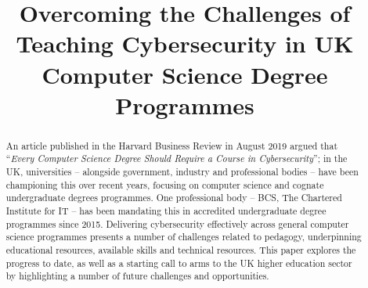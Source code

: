 \documentclass[sigconf]{acmart}
\begin{document}
\title{Overcoming the Challenges of Teaching Cybersecurity in UK Computer Science
Degree Programmes}



\begin{comment}

\author{Tom Crick}
\affiliation{%
  \institution{Swansea University}
  \city{Swansea}
  \country{UK}
}
\email{thomas.crick@swansea.ac.uk}


\author{James H. Davenport}
\affiliation{%
  \institution{ University of Bath}
  \city{Bath}
  \country{UK}
}
\email{j.h.davenport@bath.ac.uk}

\author{Alastair Irons}
\affiliation{%
  \institution{ Sunderland University}
  \city{Sunderland}
  \country{UK}
}
\email{alastair.irons@sunderland.ac.uk}

\author{Tom Prickett}
\affiliation{%
  \institution{ Northumbria University}
  \city{Newcastle upon Tyne}
  \country{UK}
}
\email{tom.prickett@northumbria.ac.uk}
\end{comment}


\renewcommand{\shortauthors}{Crick, Davenport,  Irons, and Prickett.}
\begin{abstract}
  An article published in the Harvard Business Review in August 2019
argued that ``{\emph{Every Computer Science Degree Should Require a
Course in Cybersecurity}}''\cite{cable_2019}; in the UK, universities
-- alongside government, industry and professional bodies -- have been
championing this over recent years, focusing on computer science and
cognate undergraduate degrees programmes. One professional body --
BCS, The Chartered Institute for IT -- has been mandating this in
accredited undergraduate degree programmes since
2015\cite{Cricketal2019}. Delivering cybersecurity effectively across
general computer science programmes presents a number of challenges
related to pedagogy, underpinning educational resources, available
skills and technical resources. This paper explores the progress to
date, as well as a starting call to arms to the UK higher education sector by
highlighting a number of future challenges and opportunities.
\end{abstract}
\end{document}
